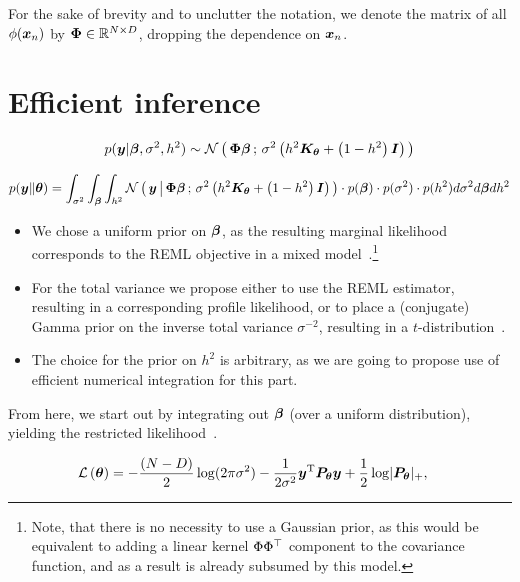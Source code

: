 \documentclass[twoside]{article}
\newcommand{\Pt}{\B{P}_{\B{\theta}}}
\begin{document}
For the sake of brevity and to unclutter the notation, we denote the matrix of all $\phi(\bm{x}_n)$ by $\bm{\Phi}\in\mathbb{R}^{N \times D}$, dropping the dependence on $\bm{x}_n$.

\section{Efficient inference}
\label{sec:inference}

\begin{align*}
p(\bm{y} | \bm{\beta}, \sigma^2, h^2 ) \sim \mathcal{N}\left(\, {\bm{\Phi}\bm{\beta}} \,;\, {\sigma^2\left(h^2\bm{K}_{\bm{\theta}} + \left(1-h^2\right)\bm{I} \right) } \,\right)
\end{align*}


\begin{align}
p(\bm{y} \| \bm{\theta}) =  \int_{\sigma^2}\int_{\bm{\beta}}\int_{h^2}\mathcal{N}\left(\, { {\bm{y}} \, \big| \, {\bm{\Phi}\bm{\beta}} } \,;\, { {\sigma^2\left(h^2\bm{K}_{\bm{\theta}} + \left(1-h^2\right)\bm{I} \right) } } \,\right) \cdot p( \bm{\beta} ) \cdot p(\sigma^2) \cdot p(h^2) d\sigma^2 d\bm{\beta} dh^2
\label{eq:marginal_likelihood}
\end{align}
\begin{itemize}
\item We chose a uniform prior on $\bm{\beta}$, as the resulting marginal likelihood corresponds to the REML objective in a mixed model~\cite{harville1974bayesian}.\footnote{Note, that there is no necessity to use a Gaussian prior, as this would be equivalent to adding a linear kernel $\Phi\Phi^{{\top}}$ component to the covariance function, and as a result is already subsumed by this model.}
\item For the total variance we propose either to use the REML estimator, resulting in a corresponding profile likelihood, or to place a (conjugate) Gamma prior on the inverse total variance $\sigma^{-2}$, resulting in a $t$-distribution~\cite{shah2014student}.
\item The choice for the prior on $h^2$ is arbitrary, as we are going to propose use of efficient numerical integration for this part.
\end{itemize}


From here, we start out by integrating out $\bm{\beta}$ (over a uniform distribution), yielding the restricted likelihood~\cite{harville1974bayesian,lippert2013thesis,lippert2014greater}.

\begin{align}
     \lik{\B{\theta}}
     &=
     -\frac{(N-D)}{2} \logt(2\pi\sigma^{2}) - \frac{1}{2\sigma^2}\B{y}\transpose\Pt\B{y}
     + \frac{1}{2} \logt \lvert \Pt \rvert_{+},
\label{eq:remlP}
\end{align}
\end{document}
